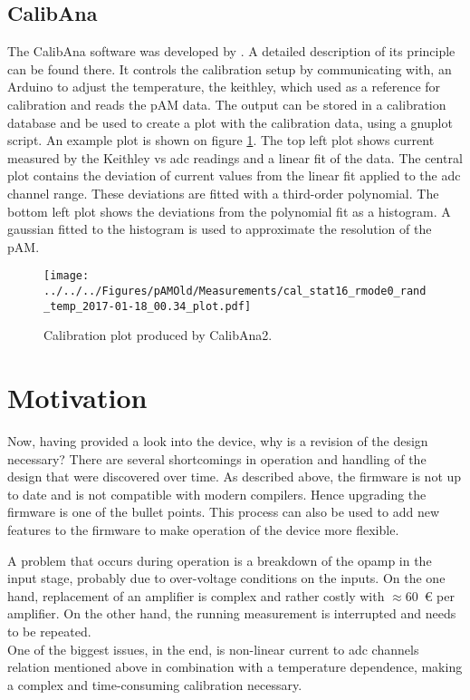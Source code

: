 \subsection{CalibAna}
The CalibAna software was developed by \cite{roedel}. A detailed description of its principle can be found there. It controls the calibration setup by communicating with, an Arduino to adjust the temperature, the \ac{keithley}, which used as a reference for calibration and reads the \ac{pAM} data. The output can be stored in a calibration database and be used to create a plot with the calibration data, using a gnuplot script. An example plot is shown on figure \ref{fig:CalibAna2:example}. The top left plot shows current measured by the Keithley vs \ac{adc} readings and a linear fit of the data. The central plot contains the deviation of current values from the linear fit applied to the \ac{adc} channel range. These deviations are fitted with a third-order polynomial. The bottom left plot shows the deviations from the polynomial fit as a histogram. A gaussian fitted to the histogram is used to approximate the resolution of the \ac{pAM}. 
\begin{figure}
	\centering
	\texttt{[image: ../../../Figures/pAMOld/Measurements/cal\_stat16\_rmode0\_rand\_temp\_2017-01-18\_00.34\_plot.pdf]}
	\caption{Calibration plot produced by CalibAna2.}
	\label{fig:CalibAna2:example}
\end{figure}


\section{Motivation}
Now, having provided a look into the device, why is a revision of the design necessary?
There are several shortcomings in operation and handling of the design that were discovered over time. 
As described above, the firmware is not up to date and is not compatible with modern compilers. Hence upgrading the firmware is one of the bullet points.
This process can also be used to add new features to the firmware to make operation of the device more flexible.

A problem that occurs during operation is a breakdown of the \ac{opamp} in the input stage, probably due to over-voltage conditions on the inputs. On the one hand, replacement of an amplifier is complex and rather costly with $\approx$\SI{60}{\euro} per amplifier.  On the other hand, the running measurement is interrupted and needs to be repeated. \\
One of the biggest issues, in the end, is non-linear current to \ac{adc} channels relation mentioned above in combination with a temperature dependence, making a complex and time-consuming calibration necessary.








